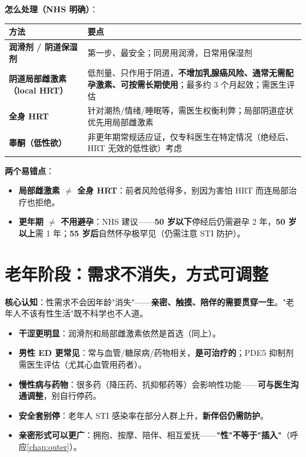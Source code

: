 \documentclass[12pt,UTF8,openany]{ctexbook}
\begin{document}
\textbf{怎么处理（NHS 明确）}：

\begin{tabularx}{\linewidth}{X X}
\toprule
\textbf{方法} & \textbf{要点} \\
\midrule
\textbf{润滑剂 / 阴道保湿剂} & 第一步、最安全；同房用润滑，日常用保湿剂 \\
\textbf{阴道局部雌激素（local HRT）} & 低剂量、只作用于阴道，\textbf{不增加乳腺癌风险、通常无需配孕激素、可按需长期使用}；最多约 3 个月起效；需医生评估 \\
\textbf{全身 HRT} & 针对潮热/情绪/睡眠等，需医生权衡利弊；局部阴道症状优先用局部雌激素 \\
\textbf{睾酮（低性欲）} & 非更年期常规适应证，仅专科医生在特定情况（绝经后、HRT 无效的低性欲）考虑 \\
\bottomrule
\end{tabularx}

\vspace{0.5em}
\textbf{两个易错点}：

\begin{itemize}[leftmargin=2em,itemsep=0.3em]
  \item \textbf{局部雌激素 $\ne$ 全身 HRT}：前者风险低得多，别因为害怕 HRT 而连局部治疗也拒绝。
  \item \textbf{更年期 $\ne$ 不用避孕}：NHS 建议——\textbf{50 岁以下}停经后仍需避孕 2 年，\textbf{50 岁以上}需 1 年；\textbf{55 岁后}自然怀孕极罕见（仍需注意 STI 防护）。
\end{itemize}

\section{老年阶段：需求不消失，方式可调整}

\textbf{核心认知}：性需求不会因年龄"消失"——\textbf{亲密、触摸、陪伴的需要贯穿一生}。"老年人不该有性生活"既不科学也不人道。

\begin{itemize}[leftmargin=2em,itemsep=0.3em]
  \item \textbf{干涩更明显}：润滑剂和局部雌激素依然是首选（同上）。
  \item \textbf{男性 ED 更常见}：常与血管/糖尿病/药物相关，\textbf{是可治疗的}；PDE5 抑制剂需医生评估（尤其心血管用药者）。
  \item \textbf{慢性病与药物}：很多药（降压药、抗抑郁药等）会影响性功能——\textbf{可与医生沟通调整}，别自行停药。
  \item \textbf{安全套别停}：老年人 STI 感染率在部分人群上升，\textbf{新伴侣仍需防护}。
  \item \textbf{亲密形式可以更广}：拥抱、按摩、陪伴、相互爱抚——\textbf{"性"不等于"插入"}（呼应\ref{chap:outer}）。
\end{itemize}
\end{document}
